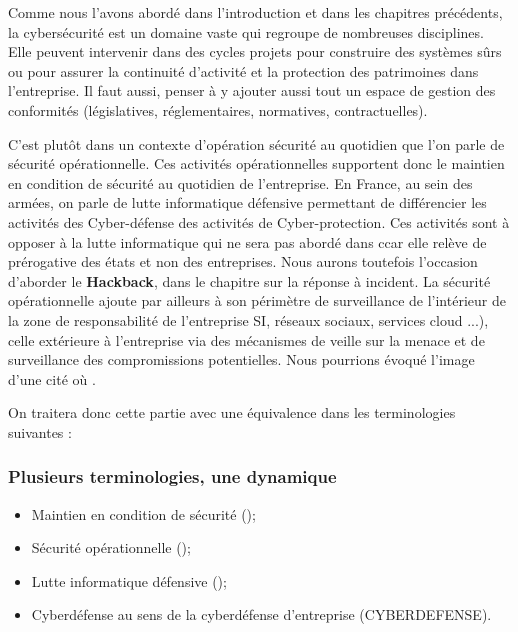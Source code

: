 Comme nous l’avons abordé dans l'introduction et dans les chapitres précédents, la cybersécurité est un domaine vaste qui regroupe de nombreuses disciplines. Elle peuvent intervenir dans des cycles projets pour construire des systèmes sûrs ou pour assurer la continuité d’activité et la protection des patrimoines dans l'entreprise. Il faut aussi, penser à y ajouter aussi tout un espace de gestion des conformités (législatives, réglementaires, normatives, contractuelles).


C’est plutôt dans un contexte d'opération sécurité au quotidien que l’on parle de sécurité opérationnelle. Ces activités opérationnelles supportent donc le maintien en condition de sécurité au quotidien de l’entreprise. En France, au sein des armées, on parle de lutte informatique défensive permettant de différencier les activités des Cyber-défense des activités de Cyber-protection. Ces activités sont à opposer à la lutte informatique qui ne sera pas abordé dans c\ecours car elle relève de prérogative des états et non des entreprises. Nous aurons toutefois l'occasion d'aborder le \textbf{Hackback}, dans le chapitre sur la réponse à incident.
La sécurité opérationnelle ajoute par ailleurs à son périmètre de surveillance de l'intérieur de la zone de responsabilité de l'entreprise SI, réseaux sociaux, services cloud ...), celle extérieure à l'entreprise via des mécanismes de veille sur la menace et de surveillance des compromissions potentielles. Nous pourrions évoqué l'image d'une cité où .

On traitera donc cette partie avec une équivalence dans les terminologies suivantes :

\begin{frame}
\frametitle<presentation>{Plusieurs terminologies, une dynamique}
	\begin{itemize}
		\item Maintien en condition de sécurité (); 
		\item Sécurité opérationnelle ();
		\item Lutte informatique défensive ();
		\item Cyberdéfense au sens de la cyberdéfense d'entreprise (CYBERDEFENSE).
	\end{itemize}
\end{frame}

